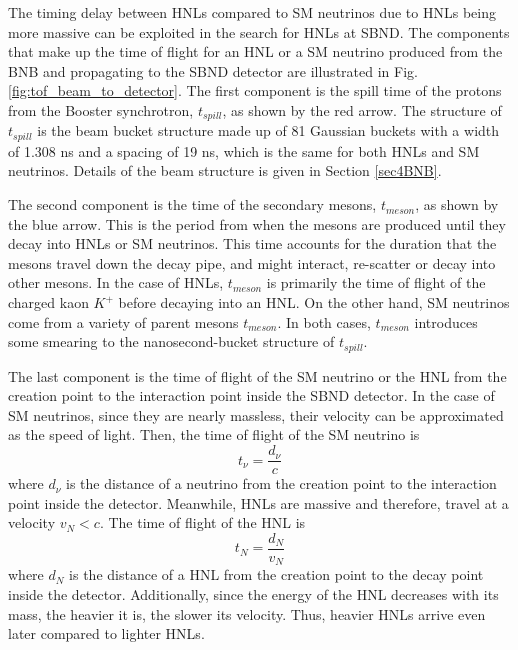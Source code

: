 The timing delay between HNLs compared to SM neutrinos due to HNLs being more massive can be exploited in the search for HNLs at SBND. 
The components that make up the time of flight for an HNL or a SM neutrino produced from the BNB and propagating to the SBND detector are illustrated in Fig. \ref{fig:tof_beam_to_detector}.
The first component is the spill time of the protons from the Booster synchrotron, $t_{spill}$, as shown by the red arrow.
The structure of $t_{spill}$ is the beam bucket structure made up of 81 Gaussian buckets with a width of 1.308 ns and a spacing of 19 ns, which is the same for both HNLs and SM neutrinos.
Details of the beam structure is given in Section \ref{sec4BNB}.   

The second component is the time of the secondary mesons, $t_{meson}$, as shown by the blue arrow.
This is the period from when the mesons are produced until they decay into HNLs or SM neutrinos.
This time accounts for the duration that the mesons travel down the decay pipe, and might interact, re-scatter or decay into other mesons.
In the case of HNLs, $t_{meson}$ is primarily the time of flight of the charged kaon $K^+$ before decaying into an HNL.
On the other hand, SM neutrinos come from a variety of parent mesons $t_{meson}$. %
In both cases, $t_{meson}$ introduces some smearing to the nanosecond-bucket structure of $t_{spill}$.

The last component is the time of flight of the SM neutrino or the HNL from the creation point to the interaction point inside the SBND detector.
In the case of SM neutrinos, since they are nearly massless, their velocity can be approximated as the speed of light. 
Then, the time of flight of the SM neutrino is  
\begin{equation}
	t_{\nu} = \frac{d_{\nu}}{c}
\end{equation}
where $d_{\nu}$ is the distance of a neutrino from the creation point to the interaction point inside the detector.
Meanwhile, HNLs are massive and therefore, travel at a velocity $v_N < c$.
The time of flight of the HNL is
\begin{equation}
	t_{N} = \frac{d_{N}}{v_N}
\end{equation}
where $d_N$ is the distance of a HNL from the creation point to the decay point inside the detector.
Additionally, since the energy of the HNL decreases with its mass, the heavier it is, the slower its velocity.
Thus, heavier HNLs arrive even later compared to lighter HNLs.

